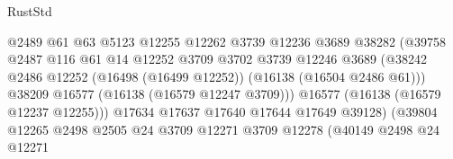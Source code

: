 \begin{lexlean}{RustStd}
\begin{coremodule}
                                            @2489
                                            @61
                                            @63
                                            @5123
                                            @12255
                                            @12262
                                            @3739
                                            @12236
                                            @3689
                                            @38282
                                            (@39758
                                              @2487
                                              @116
                                              @61
                                              @14
                                              @12252
                                              @3709
                                              @3702
                                              @3739
                                              @12246
                                              @3689
                                              (@38242
                                                @2486
                                                @12252
                                                (@16498 (@16499 @12252))
                                                (@16138 (@16504 @2486 @61)))
                                              @38209
                                              @16577
                                              (@16138 (@16579 @12247 @3709)))
                                            @16577
                                            (@16138 (@16579 @12237 @12255)))
                                          @17634
                                          @17637
                                          @17640
                                          @17644
                                          @17649
                                          @39128)
                                        (@39804
                                          @12265
                                          @2498
                                          @2505
                                          @24
                                          @3709
                                          @12271
                                          @3709
                                          @12278
                                          (@40149
                                            @2498
                                            @24
                                            @12271

\end{coremodule}
\end{lexlean}
